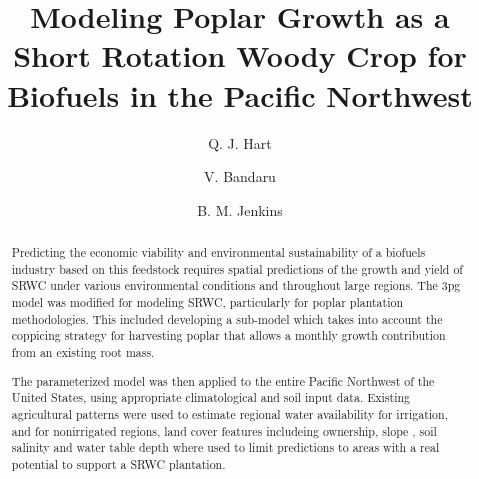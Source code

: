 \documentclass[preprint,12pt]{elsarticle}
\begin{document}
\begin{frontmatter}



\title{Modeling Poplar Growth as a Short Rotation Woody Crop for Biofuels in the Pacific Northwest}


\author[lawr]{Q. J. Hart}
\author[en]{V. Bandaru}
\author[bioag]{B. M. Jenkins}

\address{Department of Land, Air, and Water, University of California, Davis, USA}
\address{Energy Institute, University of California, Davis, USA}
\address{Department of Biological and Agricultural Engineering, University of California, Davis, USA}

\begin{abstract}
  Predicting the economic viability and environmental sustainability
  of a biofuels industry based on this feedstock requires spatial
  predictions of the growth and yield of \acf{SRWC} under various
  environmental conditions and throughout large regions.  The \acf{3pg}
  model was modified for modeling SRWC, particularly for poplar
  plantation methodologies.  This included developing a sub-model
  which takes into account the coppicing strategy for harvesting
  poplar that allows a monthly growth contribution from an existing
  root mass.

  The parameterized model was then applied to the entire Pacific
  Northwest of the United States, using appropriate climatological and
  soil input data.  Existing agricultural patterns were used to
  estimate regional water availability for irrigation, and for
  nonirrigated regions, land cover features includeing ownership,
  slope , soil salinity and water table depth where used to limit
  predictions to areas with a real potential to support a \ac{SRWC}
  plantation.


\end{abstract}
\end{frontmatter}
\end{document}
